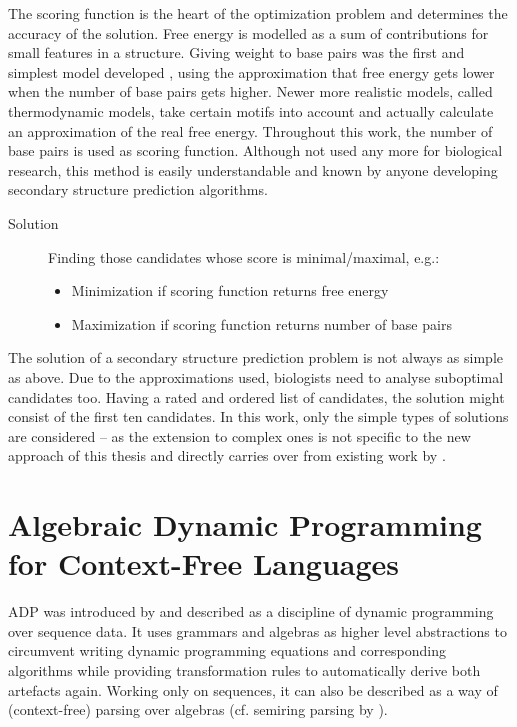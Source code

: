 \documentclass[
    a4paper,
    12pt,
    twoside,
    BCOR=12mm,
    parskip=half,
    chapterprefix,
    numbers=noenddot,
    bibliography=totoc
]{scrbook}
\begin{document}
The scoring function is the heart of the optimization problem and determines the accuracy of the solution. Free energy is modelled as a sum of contributions for small features in a structure. Giving weight to base pairs was the first and simplest model developed \citep{nussinov_algorithms_1978}, using the approximation that free energy gets lower when the number of base pairs gets higher. Newer more realistic models, called thermodynamic models, take certain motifs into account and actually calculate an approximation of the real free energy. Throughout this work, the number of base pairs is used as scoring function. Although not used any more for biological research, this method is easily understandable and known by anyone developing secondary structure prediction algorithms.

\pagebreak

\begin{description}
	\item[Solution] Finding those candidates whose score is minimal/maximal, e.g.:
		\begin{itemize}
			\item Minimization if scoring function returns free energy 
			\item Maximization if scoring function returns number of base pairs
		\end{itemize}
\end{description}

The solution of a secondary structure prediction problem is not always as simple as above. Due to the approximations used, biologists need to analyse suboptimal candidates too. Having a rated and ordered list of candidates, the solution might consist of the first ten candidates. In this work, only the simple types of solutions are considered -- as the extension to complex ones is not specific to the new approach of this thesis and directly carries over from existing work by \citet{sauthoff_bellmans_2011-1}.

\chapter{\texorpdfstring{Algebraic Dynamic Programming for Context-Free Languages}{ADP-CFL}}
\label{ch:adp-cfl}

\Gls{ADP} was introduced by \citet{giegerich_discipline_2004} and described as a discipline of dynamic programming over sequence data. It uses grammars and algebras as higher level abstractions to circumvent writing dynamic programming equations and corresponding algorithms while providing transformation rules to automatically derive both artefacts again. Working only on sequences, it can also be described as a way of (context-free) parsing over algebras (cf. semiring parsing by \citet{goodman_semiring_1999}).
\end{document}
